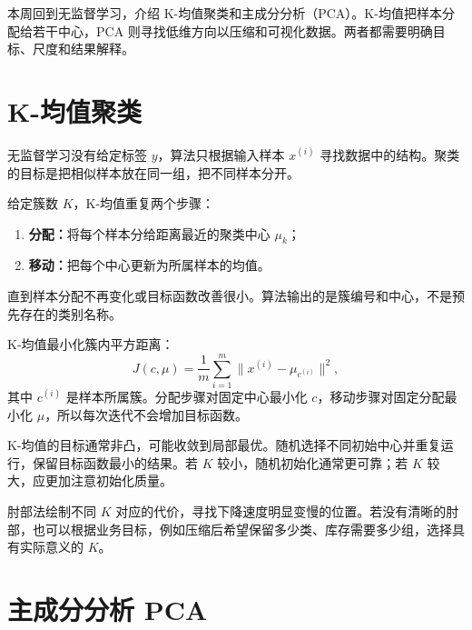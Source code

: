 


\begin{summarybox}
本周回到无监督学习，介绍 K-均值聚类和主成分分析（PCA）。K-均值把样本分配给若干中心，PCA 则寻找低维方向以压缩和可视化数据。两者都需要明确目标、尺度和结果解释。
\end{summarybox}

\section{K-均值聚类}
\begin{definitionbox}[无监督学习]
无监督学习没有给定标签 $y$，算法只根据输入样本 $x^{(i)}$ 寻找数据中的结构。聚类的目标是把相似样本放在同一组，把不同样本分开。
\end{definitionbox}
\begin{keybox}[K-均值算法]
给定簇数 $K$，K-均值重复两个步骤：
\begin{enumerate}
  \item \textbf{分配：}将每个样本分给距离最近的聚类中心 $\mu_k$；
  \item \textbf{移动：}把每个中心更新为所属样本的均值。
\end{enumerate}
直到样本分配不再变化或目标函数改善很小。算法输出的是簇编号和中心，不是预先存在的类别名称。
\end{keybox}
\begin{definitionbox}[优化目标]
K-均值最小化簇内平方距离：
\[
J(c,\mu)=\frac1m\sum_{i=1}^{m}\|x^{(i)}-\mu_{c^{(i)}}\|^2,
\]
其中 $c^{(i)}$ 是样本所属簇。分配步骤对固定中心最小化 $c$，移动步骤对固定分配最小化 $\mu$，所以每次迭代不会增加目标函数。
\end{definitionbox}
\begin{tipbox}[随机初始化与局部最优]
K-均值的目标通常非凸，可能收敛到局部最优。随机选择不同初始中心并重复运行，保留目标函数最小的结果。若 $K$ 较小，随机初始化通常更可靠；若 $K$ 较大，应更加注意初始化质量。
\end{tipbox}
\begin{examplebox}[选择 $K$]
肘部法绘制不同 $K$ 对应的代价，寻找下降速度明显变慢的位置。若没有清晰的肘部，也可以根据业务目标，例如压缩后希望保留多少类、库存需要多少组，选择具有实际意义的 $K$。
\end{examplebox}

\section{主成分分析 PCA}

